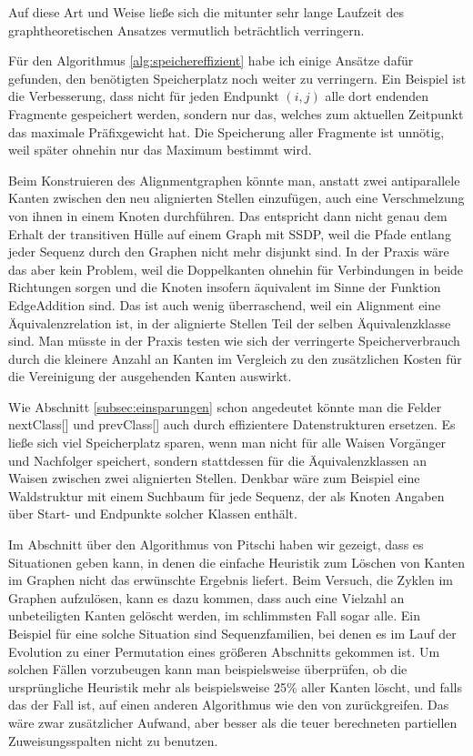 \noindent Auf diese Art und Weise ließe sich die mitunter sehr lange Laufzeit des graphtheoretischen Ansatzes vermutlich beträchtlich verringern.

Für den Algorithmus \ref{alg:speichereffizient} habe ich einige Ansätze dafür gefunden, den benötigten Speicherplatz noch weiter zu verringern. Ein Beispiel ist die Verbesserung, dass nicht für jeden Endpunkt $(i,j)$ alle dort endenden Fragmente gespeichert werden, sondern nur das, welches zum aktuellen Zeitpunkt das maximale Präfixgewicht hat. Die Speicherung aller Fragmente ist unnötig, weil später ohnehin nur das Maximum bestimmt wird.

Beim Konstruieren des Alignmentgraphen könnte man, anstatt zwei antiparallele Kanten zwischen den neu alignierten Stellen einzufügen, auch eine Verschmelzung von ihnen in einem Knoten durchführen. Das entspricht dann nicht genau dem Erhalt der transitiven Hülle auf einem Graph mit SSDP, weil die Pfade entlang jeder Sequenz durch den Graphen nicht mehr disjunkt sind. In der Praxis wäre das aber kein Problem, weil die Doppelkanten ohnehin für Verbindungen in beide Richtungen sorgen und die Knoten insofern äquivalent im Sinne der Funktion \textrm{EdgeAddition} sind. Das ist auch wenig überraschend, weil ein Alignment eine Äquivalenzrelation ist, in der alignierte Stellen Teil der selben Äquivalenzklasse sind. Man müsste in der Praxis testen wie sich der verringerte Speicherverbrauch durch die kleinere Anzahl an Kanten im Vergleich zu den zusätzlichen Kosten für die Vereinigung der ausgehenden Kanten auswirkt.

Wie Abschnitt \ref{subsec:einsparungen} schon angedeutet könnte man die Felder nextClass[] und prevClass[] auch durch effizientere Datenstrukturen ersetzen. Es ließe sich viel Speicherplatz sparen, wenn man nicht für alle Waisen Vorgänger und Nachfolger speichert, sondern stattdessen für die Äquivalenzklassen an Waisen zwischen zwei alignierten Stellen. Denkbar wäre zum Beispiel eine Waldstruktur mit einem Suchbaum für jede Sequenz, der als Knoten Angaben über Start- und Endpunkte solcher Klassen enthält.

Im Abschnitt über den Algorithmus von Pitschi haben wir gezeigt, dass es Situationen geben kann, in denen die einfache Heuristik zum Löschen von Kanten im Graphen nicht das erwünschte Ergebnis liefert. Beim Versuch, die Zyklen im Graphen aufzulösen, kann es dazu kommen, dass auch eine Vielzahl an unbeteiligten Kanten gelöscht werden, im schlimmsten Fall sogar alle. Ein Beispiel für eine solche Situation sind Sequenzfamilien, bei denen es im Lauf der Evolution zu einer Permutation eines größeren Abschnitts gekommen ist. Um solchen Fällen vorzubeugen kann man beispielsweise überprüfen, ob die ursprüngliche Heuristik mehr als beispielsweise 25\% aller Kanten löscht, und falls das der Fall ist, auf einen anderen Algorithmus wie den von \cite{els93} zurückgreifen. Das wäre zwar zusätzlicher Aufwand, aber besser als die teuer berechneten partiellen Zuweisungsspalten nicht zu benutzen.

